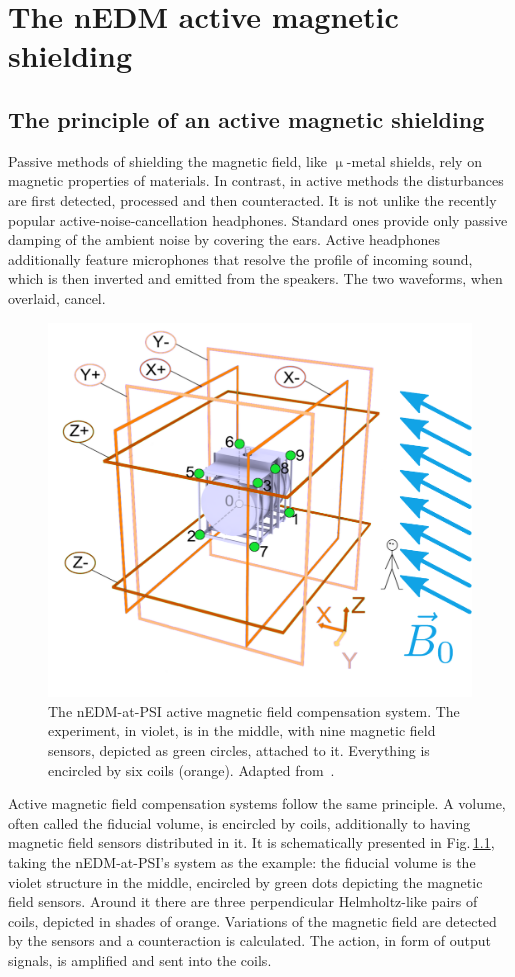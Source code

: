 \chapter{The nEDM active magnetic shielding}

\label{ch:nedm_sfc}


\section{The principle of an active magnetic shielding}
Passive methods of shielding the magnetic field, like $\upmu$-metal shields, rely on magnetic properties of materials. In contrast, in active methods the disturbances are first detected, processed and then counteracted. It is not unlike the recently popular active-noise-cancellation headphones. Standard ones provide only passive damping of the ambient noise by covering the ears. Active headphones additionally feature microphones that resolve the profile of incoming sound, which is then inverted and emitted from the speakers. The two waveforms, when overlaid, cancel.

\begin{figure}
  \centering
  \includegraphics[width=0.8\linewidth]{gfx/nEDM_SFC/SFCplain.pdf}
  \caption{The nEDM-at-PSI active magnetic field compensation system. The experiment, in violet, is in the middle, with nine magnetic field sensors, depicted as green circles, attached to it. Everything is encircled by six coils (orange). Adapted from~\cite{Franke2013}.}
  \label{fig:sfc-scheme}
\end{figure}

Active magnetic field compensation systems follow the same principle. A volume, often called the fiducial volume, is encircled by coils, additionally to having magnetic field sensors distributed in it. It is schematically presented in Fig.\,\ref{fig:sfc-scheme}, taking the nEDM-at-PSI's system as the example: the fiducial volume is the violet structure in the middle, encircled by green dots depicting the magnetic field sensors. Around it there are three perpendicular Helmholtz-like pairs of coils, depicted in shades of orange. Variations of the magnetic field are detected by the sensors and a counteraction is calculated. The action, in form of output signals, is amplified and sent into the coils.


